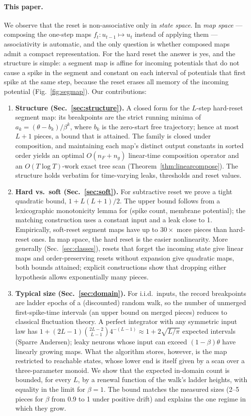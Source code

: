 \documentclass[10pt]{article}
\newcounter{algo}
\theoremstyle{remark}
\begin{document}
\paragraph{This paper.}
We observe that the reset is non-associative only in \emph{state space}.
In \emph{map space} --- composing the one-step maps $f_t:u_{t-1}\mapsto u_t$ instead of applying them --- associativity is automatic, and the only question is whether composed maps admit a compact representation.
For the hard reset the answer is yes, and the structure is simple: a segment map is affine for incoming potentials that do not cause a spike in the segment and constant on each interval of potentials that first spike at the same step, because the reset erases all memory of the incoming potential (Fig.~\ref{fig:segmap}).
Our contributions:
\begin{enumerate}[leftmargin=*]
\item \textbf{Structure (Sec.~\ref{sec:structure}).} A closed form for the $L$-step hard-reset segment map: its breakpoints are the strict running minima of $a_k=(\theta-b_k)/\beta^k$, where $b_k$ is the zero-start free trajectory; hence at most $L+1$ pieces, a bound that is attained. The family is closed under composition, and maintaining each map's distinct output constants in sorted order yields an optimal $O(n_F+n_g)$ linear-time composition operator and an $O(T\log T)$-work exact tree scan (Theorem~\ref{thm:linearcompose}). The structure holds verbatim for time-varying leaks, thresholds and reset values.
\item \textbf{Hard vs.\ soft (Sec.~\ref{sec:soft}).} For subtractive reset we prove a tight quadratic bound, $1+L(L+1)/2$. The upper bound follows from a lexicographic monotonicity lemma for (spike count, membrane potential); the matching construction uses a constant input and a leak close to 1. Empirically, soft-reset segment maps have up to $30\times$ more pieces than hard-reset ones. In map space, the hard reset is the easier nonlinearity. More generally (Sec.~\ref{sec:classes}), resets that forget the incoming state give linear maps and order-preserving resets without expansion give quadratic maps, both bounds attained; explicit constructions show that dropping either hypothesis allows exponentially many pieces.
\item \textbf{Typical size (Sec.~\ref{sec:domain}).} For i.i.d.\ inputs, the record breakpoints are ladder epochs of a (discounted) random walk, so the number of unmerged first-spike-time intervals (an upper bound on merged pieces) reduces to classical fluctuation theory. A perfect integrator with any symmetric input law has $1+(2L-1)\binom{2L-2}{L-1}4^{-(L-1)}\approx1+2\sqrt{L/\pi}$ expected intervals (Sparre Andersen); leaky neurons whose input can exceed $(1-\beta)\theta$ have linearly growing maps. What the algorithm stores, however, is the map restricted to reachable states, whose lower end is itself given by a scan over a three-parameter monoid. We show that the expected in-domain count is bounded, for every $L$, by a renewal function of the walk's ladder heights, with equality in the limit for $\beta=1$. The bound matches the measured sizes (2--5 pieces for $\beta$ from 0.9 to 1 under positive drift) and explains the one regime in which they grow.

\end{enumerate}
\end{document}
